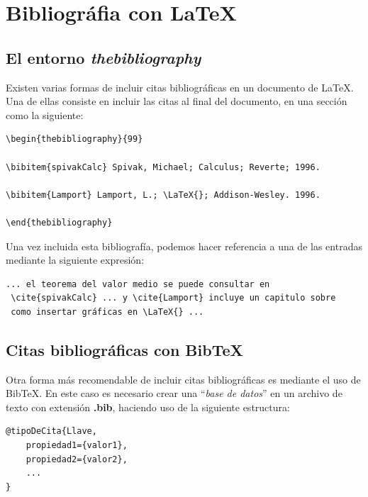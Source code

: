 \documentclass[letterpaper,12pt]{book}
\begin{document}
\chapter{Bibliográfia con \LaTeX{}}

\section{El entorno \textit{thebibliography}}

Existen varias formas de incluir citas bibliográficas en un 
documento de \LaTeX{}. Una de ellas consiste en incluir las
citas al final del documento, en una sección como la siguiente:

\begin{verbatim}
\begin{thebibliography}{99}

\bibitem{spivakCalc} Spivak, Michael; Calculus; Reverte; 1996.

\bibitem{Lamport} Lamport, L.; \LaTeX{}; Addison-Wesley. 1996.

\end{thebibliography}
\end{verbatim}

Una vez incluida esta bibliografía, podemos hacer referencia a
una de las entradas mediante la siguiente expresión:

\begin{verbatim}
... el teorema del valor medio se puede consultar en
 \cite{spivakCalc} ... y \cite{Lamport} incluye un capitulo sobre
 como insertar gráficas en \LaTeX{} ...
\end{verbatim}


\section{Citas bibliográficas con Bib\TeX{}}

Otra forma más recomendable de incluir citas bibliográficas es
mediante el uso de Bib\TeX{}. En este caso es necesario crear
una ``\textit{base de datos}'' en un archivo de texto con 
extensión \textbf{.bib}, haciendo uso de la siguiente estructura:

\begin{verbatim}
@tipoDeCita{Llave,
	propiedad1={valor1},
	propiedad2={valor2},
	...
}
\end{verbatim}
\end{document}
